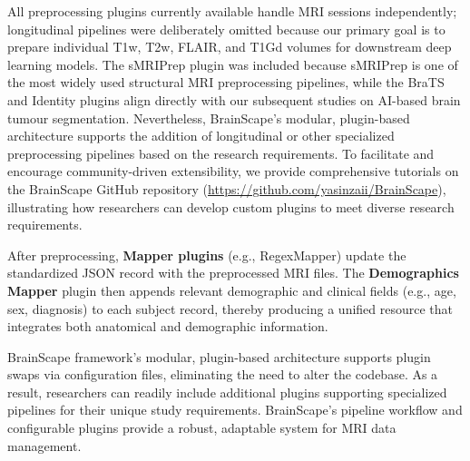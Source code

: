 All preprocessing plugins currently available handle MRI sessions independently; 
longitudinal pipelines were deliberately omitted because our primary goal is to prepare 
individual T1w, T2w, FLAIR, and T1Gd volumes for downstream deep learning models.
The sMRIPrep plugin was included because sMRIPrep is one of the most widely used structural MRI preprocessing pipelines, 
while the BraTS and Identity plugins align directly with our subsequent studies on AI-based brain tumour segmentation.
Nevertheless, BrainScape's modular, plugin-based architecture supports the addition of longitudinal or 
other specialized preprocessing pipelines based on the research requirements. 
To facilitate and encourage community-driven extensibility, we provide comprehensive tutorials 
on the BrainScape GitHub repository (\url{https://github.com/yasinzaii/BrainScape}), 
illustrating how researchers can develop custom plugins to meet diverse research requirements.

After preprocessing, \textbf{Mapper plugins} (e.g., RegexMapper) update the standardized JSON record 
with the preprocessed MRI files. The \textbf{Demographics Mapper} plugin then appends relevant demographic 
and clinical fields (e.g., age, sex, diagnosis) to each subject record, thereby producing a unified 
resource that integrates both anatomical and demographic information.

BrainScape framework's modular, plugin-based architecture supports plugin swaps via configuration files, 
eliminating the need to alter the codebase. As a result, researchers can 
readily include additional plugins supporting specialized pipelines for their unique study requirements. 
BrainScape's pipeline workflow and configurable plugins provide a robust, adaptable system for MRI data management.



